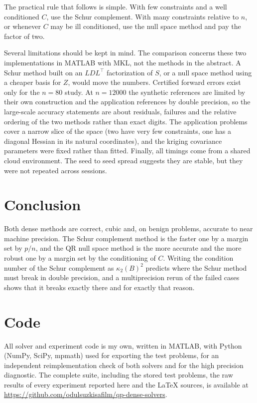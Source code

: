\documentclass[10pt]{article}
\newcommand{\kap}{\kappa_2}
\begin{document}
The practical rule that follows is simple. With few constraints and a well conditioned
$C$, use the Schur complement. With many constraints relative to $n$, or whenever $C$ may
be ill conditioned, use the null space method and pay the factor of two.

Several limitations should be kept in mind. The comparison concerns these two
implementations in MATLAB with MKL, not the methods in the abstract. A Schur method built
on an $LDL^\top$ factorization of $S$, or a null space method using a cheaper basis for
$Z$, would move the numbers. Certified forward errors exist only for the $n=80$ study. At
$n=12000$ the synthetic references are limited by their own construction and the
application references by double precision, so the large-scale accuracy statements are
about residuals, failures and the relative ordering of the two methods rather than exact
digits. The application problems cover a narrow slice of the space (two have very few
constraints, one has a diagonal Hessian in its natural coordinates), and the kriging
covariance parameters were fixed rather than fitted. Finally, all timings come from a
shared cloud environment. The seed to seed spread suggests they are stable, but they
were not repeated across sessions.

\section{Conclusion}

Both dense methods are correct, cubic and, on benign problems, accurate to near machine
precision. The Schur complement method is the faster one by a margin set by $p/n$, and the
QR null space method is the more accurate and the more robust one by a margin set by the
conditioning of $C$. Writing the condition number of the Schur complement as
$\kap(B)^2$ predicts where the Schur method must break in double precision, and a
multiprecision rerun of the failed cases shows that it breaks exactly there and for
exactly that reason.

\section{Code}\label{sec:code}

All solver and experiment code is my own, written in MATLAB, with Python (NumPy, SciPy,
mpmath) used for exporting the test problems, for an independent reimplementation check
of both solvers and for the high precision diagnostic. The complete suite, including the
stored test problems, the raw results of every experiment reported here and the LaTeX
sources, is available at \url{https://github.com/odulsuzkisafilm/qp-dense-solvers}.
\end{document}

